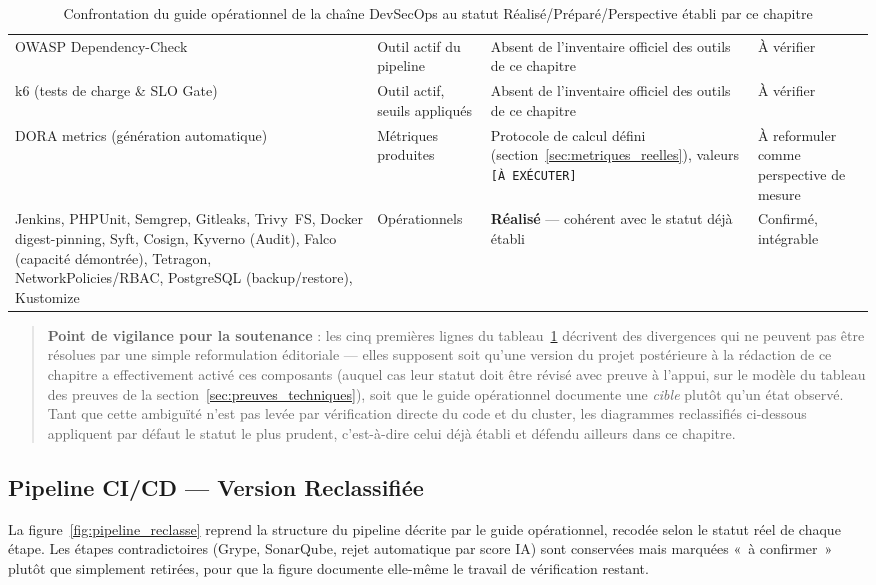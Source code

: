 \begin{table}[htbp]
\begin{tabular}{@{}p{3.4cm}p{3.6cm}p{4.2cm}p{2.4cm}@{}}
OWASP Dependency-Check & Outil actif du pipeline & Absent de l'inventaire officiel des outils de ce chapitre & À vérifier \\
k6 (tests de charge \& SLO Gate) & Outil actif, seuils appliqués & Absent de l'inventaire officiel des outils de ce chapitre & À vérifier \\
DORA metrics (génération automatique) & Métriques produites & Protocole de calcul défini (section~\ref{sec:metriques_reelles}), valeurs \texttt{[À EXÉCUTER]} & À reformuler comme perspective de mesure \\
Jenkins, PHPUnit, Semgrep, Gitleaks, Trivy~FS, Docker digest-pinning, Syft, Cosign, Kyverno (Audit), Falco (capacité démontrée), Tetragon, NetworkPolicies/RBAC, PostgreSQL (backup/restore), Kustomize & Opérationnels & \textbf{Réalisé} --- cohérent avec le statut déjà établi & Confirmé, intégrable \\
\bottomrule
\end{tabular}
\caption{Confrontation du guide opérationnel de la chaîne DevSecOps au statut Réalisé/Préparé/Perspective établi par ce chapitre}
\label{tab:ecarts_guide_reclasse}
\end{table}

\begin{quote}
\textbf{Point de vigilance pour la soutenance} : les cinq premières lignes du
tableau~\ref{tab:ecarts_guide_reclasse} décrivent des divergences qui ne
peuvent pas être résolues par une simple reformulation éditoriale --- elles
supposent soit qu'une version du projet postérieure à la rédaction de ce
chapitre a effectivement activé ces composants (auquel cas leur statut doit
être révisé avec preuve à l'appui, sur le modèle du tableau des preuves de la
section~\ref{sec:preuves_techniques}), soit que le guide opérationnel
documente une \emph{cible} plutôt qu'un état observé. Tant que cette
ambiguïté n'est pas levée par vérification directe du code et du cluster,
les diagrammes reclassifiés ci-dessous appliquent par défaut le statut le
plus prudent, c'est-à-dire celui déjà établi et défendu ailleurs dans ce
chapitre.
\end{quote}

\subsection{Pipeline CI/CD --- Version Reclassifiée}
\label{sub:pipeline_reclasse}

La figure~\ref{fig:pipeline_reclasse} reprend la structure du pipeline décrite
par le guide opérationnel, recodée selon le statut réel de chaque étape. Les
étapes contradictoires (Grype, SonarQube, rejet automatique par score IA) sont
conservées mais marquées «~à confirmer~» plutôt que simplement retirées,
pour que la figure documente elle-même le travail de vérification restant.

